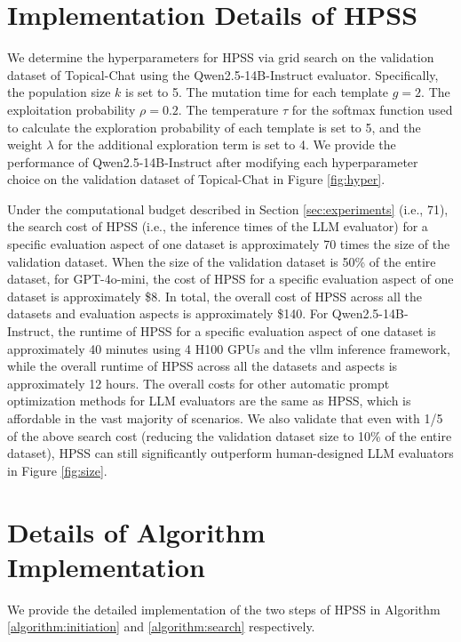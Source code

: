 \section{Implementation Details of HPSS}
\label{appendix:hpss}
We determine the hyperparameters for HPSS via grid search on the validation dataset of Topical-Chat using the Qwen2.5-14B-Instruct evaluator. Specifically, the population size $k$ is set to 5.
The mutation time for each template $g = 2$.  The exploitation probability $\rho = 0.2$.
The temperature $\tau$ for the softmax function used to calculate the exploration probability of each template is set to 5, and the weight $\lambda$ for the additional exploration term is set to 4. 
We provide the performance of Qwen2.5-14B-Instruct after modifying each hyperparameter choice on the validation dataset of Topical-Chat in Figure \ref{fig:hyper}.

Under the computational budget described in Section \ref{sec:experiments} (i.e., 71), the search cost of HPSS (i.e., the inference times of the LLM evaluator) for a specific evaluation aspect of one dataset is approximately 70 times the size of the validation dataset. 
When the size of the validation dataset is 50\% of the entire dataset, for GPT-4o-mini, the cost of HPSS for a specific evaluation aspect of one dataset is approximately \$8. 
In total, the overall cost of HPSS across all the datasets and evaluation aspects is approximately \$140. 
For Qwen2.5-14B-Instruct, the runtime of HPSS for a specific evaluation aspect of one dataset is approximately 40 minutes using 4 H100 GPUs and the vllm \cite{10.1145/3600006.3613165} inference framework, while the overall runtime of HPSS across all the datasets and aspects is approximately 12 hours. 
The overall costs for other automatic prompt optimization methods for LLM evaluators are the same as HPSS, which is affordable in the vast majority of scenarios.
We also validate that even with 1/5 of the above search cost (reducing the validation dataset size to 10\% of the entire dataset), HPSS can still significantly outperform human-designed LLM evaluators in Figure \ref{fig:size}.



\section{Details of Algorithm Implementation}
 \label{appendix:algorithm}
We provide the detailed implementation of the two steps of HPSS in Algorithm \ref{algorithm:initiation} and \ref{algorithm:search} respectively.



